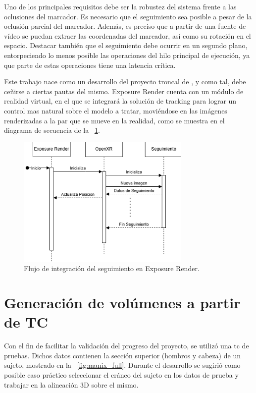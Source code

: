 Uno de los principales requisitos debe ser la robustez del sistema frente a las oclusiones del marcador. Es necesario que el seguimiento sea posible a pesar de la oclusión parcial del marcador. Además, es preciso que a partir de una fuente de vídeo se puedan extraer las coordenadas del marcador, así como su rotación en el espacio. Destacar también que el seguimiento debe ocurrir en un segundo plano, entorpeciendo lo menos posible las operaciones del hilo principal de ejecución, ya que parte de estas operaciones tiene una latencia crítica.

Este trabajo nace como un desarrollo del proyecto troncal de \citeauthor{IglesiasGuitian2022}, y como tal, debe ceñirse a ciertas pautas del mismo. Exposure Render cuenta con un módulo de realidad virtual, en el que se integrará la solución de tracking para lograr un control mas natural sobre el modelo a tratar, moviéndose en las imágenes renderizadas a la par que se mueve en la realidad, como se muestra en el diagrama de secuencia de la \figurename~\ref{fig:flow_exposure}.

\begin{figure}
	\centering
	\includegraphics[width=0.75\textwidth]{imaxes/flow_exposure.png}
	\caption{Flujo de integración del seguimiento en Exposure Render.}
	\label{fig:flow_exposure}
\end{figure}

\section{Generación de volúmenes a partir de TC}
Con el fin de facilitar la validación del progreso del proyecto, se utilizó una \acrshort{tc} de pruebas. Dichos datos contienen la sección superior (hombros y cabeza) de un sujeto, mostrado en la \figurename~\ref{fig:manix_full}. Durante el desarrollo se sugirió como posible caso práctico seleccionar el cráneo del sujeto en los datos de prueba y trabajar en la alineación 3D sobre el mismo.

